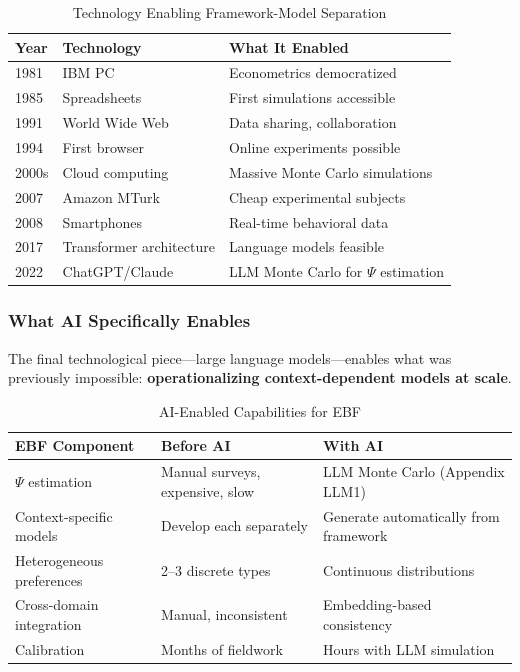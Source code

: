 \begin{table}[htbp]
\centering
\caption{Technology Enabling Framework-Model Separation}
\label{tab:tech-milestones}
\renewcommand{\arraystretch}{1.3}
\small
\begin{tabular}{@{}llp{6cm}@{}}
\toprule
\textbf{Year} & \textbf{Technology} & \textbf{What It Enabled} \\
\midrule
1981 & IBM PC & Econometrics democratized \\
1985 & Spreadsheets & First simulations accessible \\
1991 & World Wide Web & Data sharing, collaboration \\
1994 & First browser & Online experiments possible \\
2000s & Cloud computing & Massive Monte Carlo simulations \\
2007 & Amazon MTurk & Cheap experimental subjects \\
2008 & Smartphones & Real-time behavioral data \\
2017 & Transformer architecture & Language models feasible \\
2022 & ChatGPT/Claude & LLM Monte Carlo for $\Psi$ estimation \\
\bottomrule
\end{tabular}
\end{table}

\subsubsection{What AI Specifically Enables}

The final technological piece---large language models---enables what was
previously impossible: \textbf{operationalizing context-dependent models
at scale}.

\begin{table}[htbp]
\centering
\caption{AI-Enabled Capabilities for EBF}
\label{tab:ai-enables}
\renewcommand{\arraystretch}{1.3}
\small
\begin{tabular}{@{}lp{4.5cm}p{4.5cm}@{}}
\toprule
\textbf{EBF Component} & \textbf{Before AI} & \textbf{With AI} \\
\midrule
$\Psi$ estimation & Manual surveys, expensive, slow &
    LLM Monte Carlo (Appendix LLM1) \\
Context-specific models & Develop each separately &
    Generate automatically from framework \\
Heterogeneous preferences & 2--3 discrete types &
    Continuous distributions \\
Cross-domain integration & Manual, inconsistent &
    Embedding-based consistency \\
Calibration & Months of fieldwork &
    Hours with LLM simulation \\
\bottomrule
\end{tabular}
\end{table}

